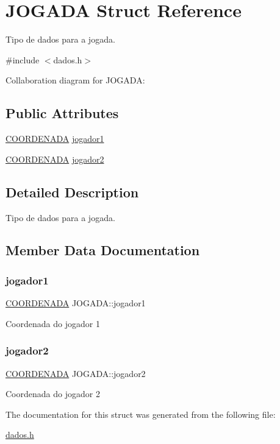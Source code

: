 \hypertarget{structJOGADA}{}\section{J\+O\+G\+A\+DA Struct Reference}
\label{structJOGADA}


Tipo de dados para a jogada.  




{\ttfamily \#include $<$dados.\+h$>$}



Collaboration diagram for J\+O\+G\+A\+DA\+:
\subsection*{Public Attributes}
\begin{DoxyCompactItemize}
\item 
\hyperlink{structCOORDENADA}{C\+O\+O\+R\+D\+E\+N\+A\+DA} \hyperlink{structJOGADA_a93d9306cb0c49b66b7d9a615bffe0149}{jogador1}
\item 
\hyperlink{structCOORDENADA}{C\+O\+O\+R\+D\+E\+N\+A\+DA} \hyperlink{structJOGADA_ab46b16dfbdc7f2af9430c8dcdac0914b}{jogador2}
\end{DoxyCompactItemize}


\subsection{Detailed Description}
Tipo de dados para a jogada. 

\subsection{Member Data Documentation}
\mbox{\label{structJOGADA_a93d9306cb0c49b66b7d9a615bffe0149}} 
\subsubsection{\texorpdfstring{jogador1}{jogador1}}
{\footnotesize\ttfamily \hyperlink{structCOORDENADA}{C\+O\+O\+R\+D\+E\+N\+A\+DA} J\+O\+G\+A\+D\+A\+::jogador1}

Coordenada do jogador 1 \mbox{\label{structJOGADA_ab46b16dfbdc7f2af9430c8dcdac0914b}} 
\subsubsection{\texorpdfstring{jogador2}{jogador2}}
{\footnotesize\ttfamily \hyperlink{structCOORDENADA}{C\+O\+O\+R\+D\+E\+N\+A\+DA} J\+O\+G\+A\+D\+A\+::jogador2}

Coordenada do jogador 2 

The documentation for this struct was generated from the following file\+:\begin{DoxyCompactItemize}
\item 
\hyperlink{dados_8h}{dados.\+h}\end{DoxyCompactItemize}
